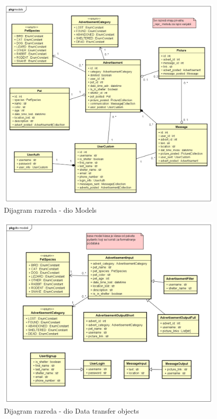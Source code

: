			\begin{figure}[H]
				\includegraphics[scale=0.55]{dijagrami/dijagramiRazreda/Models.PNG} %
				\centering
				\caption{Dijagram razreda - dio Models}
				\label{fig:drModels}
			\end{figure}
			
			\begin{figure}[H]
				\includegraphics[scale=0.45]{dijagrami/dijagramiRazreda/dto.PNG} %
				\centering
				\caption{Dijagram razreda - dio Data transfer objects}
				\label{fig:drDataTransferObjects}
			\end{figure}
			
